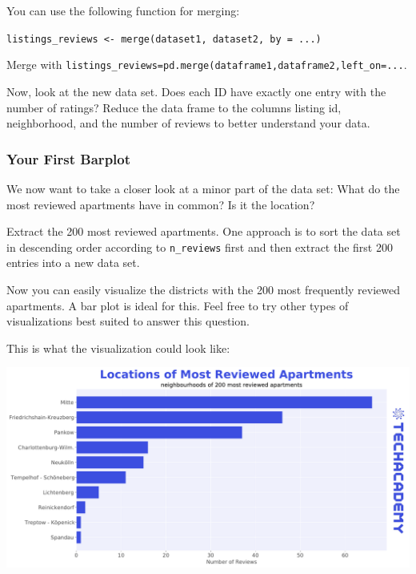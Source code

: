 \documentclass[
  11pt,
]{article}
\newenvironment{tips}[1]
  {
  \begin{itemize}
  \footnotesize
  \renewcommand{\labelitemi}{
    \raisebox{-.7\height}[0pt][0pt]{
      {\setkeys{Gin}{width=3em,keepaspectratio}
        \texttt{[image: images/\#1.png]}}
    }
  }
  \setlength{\fboxsep}{1em}
  \begin{rbox}
  \item
  }
  {
  \end{rbox}
  \end{itemize}
  }
\newenvironment{tipsp}[1]
  {
  \begin{itemize}
  \footnotesize
  \renewcommand{\labelitemi}{
    \raisebox{-.7\height}[0pt][0pt]{
      {\setkeys{Gin}{width=3em,keepaspectratio}
        \texttt{[image: images/\#1.png]}}
    }
  }
  \setlength{\fboxsep}{1em}
  \begin{pbox}
  \item
  }
  {
  \end{pbox}
  \end{itemize}
  }
\begin{document}
\begin{tips}r
You can use the following function for merging:

\texttt{listings\_reviews\ \textless{}-\ merge(dataset1,\ dataset2,\ by\ =\ ...)}

\end{tips}

\begin{tipsp}p
Merge with \texttt{listings\_reviews=pd.merge(dataframe1,dataframe2,left\_on=...}.

\end{tipsp}

Now, look at the new data set.
Does each ID have exactly one entry with the number of ratings?
Reduce the data frame to the columns listing id, neighborhood, and the number of reviews to better understand your data.

\hypertarget{your-first-barplot}{%
\subsubsection{Your First Barplot}\label{your-first-barplot}}

We now want to take a closer look at a minor part of the data set: What do the most reviewed apartments have in common?
Is it the location?

Extract the 200 most reviewed apartments.
One approach is to sort the data set in descending order according to \texttt{n\_reviews} first and then extract the first 200 entries into a new data set.

Now you can easily visualize the districts with the 200 most frequently reviewed apartments.
A bar plot is ideal for this.
Feel free to try other types of visualizations best suited to answer this question.

This is what the visualization could look like:

\begin{center}\includegraphics[width=1\linewidth]{plot/01_python/hbars_reviews} \end{center}
\end{document}
